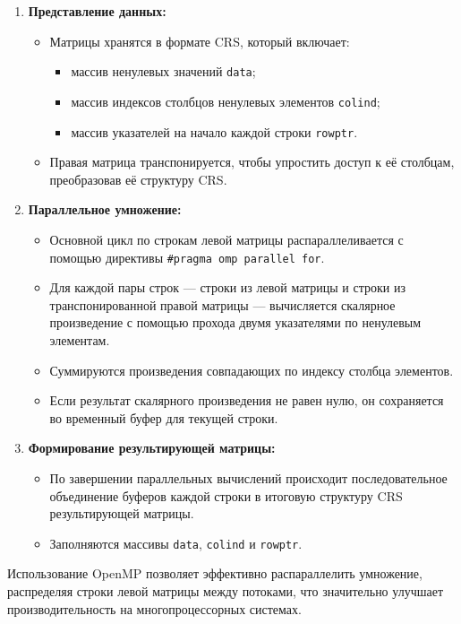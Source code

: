 \documentclass[a4paper,12pt]{article}
\begin{document}
\begin{enumerate}
  \item \textbf{Представление данных:}
  \begin{itemize}
    \item Матрицы хранятся в формате CRS, который включает:
      \begin{itemize}
        \item массив ненулевых значений \texttt{data};
        \item массив индексов столбцов ненулевых элементов \texttt{colind};
        \item массив указателей на начало каждой строки \texttt{rowptr}.
      \end{itemize}
    \item Правая матрица транспонируется, чтобы упростить доступ к её столбцам, 
    преобразовав её структуру CRS.
  \end{itemize}

  \item \textbf{Параллельное умножение:}
  \begin{itemize}
    \item Основной цикл по строкам левой матрицы распараллеливается с помощью директивы 
    \texttt{\#pragma omp parallel for}.
    \item Для каждой пары строк — строки из левой матрицы и строки из транспонированной правой матрицы — вычисляется скалярное произведение с помощью прохода двумя указателями по ненулевым элементам.
    \item Суммируются произведения совпадающих по индексу столбца элементов.
    \item Если результат скалярного произведения не равен нулю, он сохраняется во временный буфер для текущей строки.
  \end{itemize}

  \item \textbf{Формирование результирующей матрицы:}
  \begin{itemize}
    \item По завершении параллельных вычислений происходит последовательное объединение буферов каждой строки в итоговую структуру CRS результирующей матрицы.
    \item Заполняются массивы \texttt{data}, \texttt{colind} и \texttt{rowptr}.
  \end{itemize}
\end{enumerate}

Использование OpenMP позволяет эффективно распараллелить умножение, распределяя строки левой матрицы между потоками, что значительно улучшает производительность на многопроцессорных системах.
\end{document}
